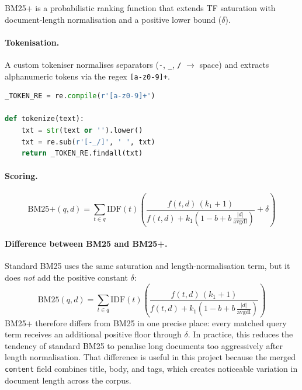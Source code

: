 \documentclass[11pt,a4paper]{article}
\begin{document}
BM25+ is a probabilistic ranking function that extends TF saturation with
document-length normalisation and a positive lower bound ($\delta$).

\paragraph{Tokenisation.}
A custom tokeniser normalises separators (\texttt{-}, \texttt{\_}, \texttt{/}
$\to$ space) and extracts alphanumeric tokens via the regex
\texttt{[a-z0-9]+}.

\begin{lstlisting}[language=Python]
_TOKEN_RE = re.compile(r'[a-z0-9]+')

def tokenize(text):
    txt = str(text or '').lower()
    txt = re.sub(r'[-_/]', ' ', txt)
    return _TOKEN_RE.findall(txt)
\end{lstlisting}

\paragraph{Scoring.}
\[
\text{BM25+}(q,d) = \sum_{t \in q} \text{IDF}(t)
\left(
  \frac{f(t,d)\,(k_1+1)}
       {f(t,d) + k_1\!\left(1 - b + b\,\frac{|d|}{\text{avgdl}}\right)}
  + \delta
\right)
\]

\paragraph{Difference between BM25 and BM25+.}
Standard BM25 uses the same saturation and length-normalisation term, but it
does \emph{not} add the positive constant $\delta$:
\[
\text{BM25}(q,d) = \sum_{t \in q} \text{IDF}(t)
\left(
  \frac{f(t,d)\,(k_1+1)}
       {f(t,d) + k_1\!\left(1 - b + b\,\frac{|d|}{\text{avgdl}}\right)}
\right)
\]
BM25+ therefore differs from BM25 in one precise place: every matched query
term receives an additional positive floor through $\delta$.  In practice,
this reduces the tendency of standard BM25 to penalise long documents too
aggressively after length normalisation.  That difference is useful in this
project because the merged \texttt{content} field combines title, body, and
tags, which creates noticeable variation in document length across the corpus.
\end{document}
